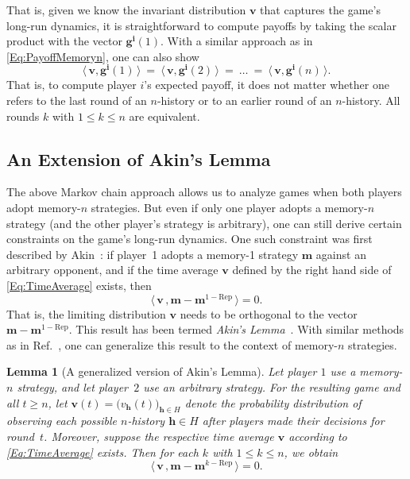 \documentclass[9pt,twoside,lineno]{pnas-new}
\theoremstyle{plainCl1}
\newtheorem{lemma}{Lemma}
\theoremstyle{plainCl2}
\begin{document}
That is, given we know the invariant distribution $\mathbf{v}$ that captures the game's long-run dynamics, it is straightforward to compute payoffs by taking the scalar product with the vector $\mathbf{g^i}(1)$.
With a similar approach as in \eqref{Eq:PayoffMemoryn}, one can also show
\begin{equation} \label{Eq:EquivalencePayoff}
\big\langle\, \mathbf{v}, \mathbf{g^i}(1)\,\big\rangle  
~=~ \big\langle\, \mathbf{v}, \mathbf{g^i}(2)\,\big\rangle
~=~ \ldots
~=~ \big\langle\, \mathbf{v}, \mathbf{g^i}(n)\,\big\rangle.
\end{equation}
That is, to compute player $i$'s expected payoff, it does not matter whether one refers to the last round of an $n$-history or to an earlier round of an $n$-history. All rounds $k$ with $1\!\le\! k\! \le \! n$ are equivalent.



\subsection{An Extension of Akin's Lemma}
The above Markov chain approach allows us to analyze games when both players adopt memory-$n$ strategies. 
But even if only one player adopts a memory-$n$ strategy (and the other player's strategy is arbitrary), one can still  derive certain constraints on the game's long-run dynamics. 
One such constraint was first described by Akin~\citep{akin:EGADS:2016}: 
if player~1 adopts a memory-1 strategy $\mathbf{m}$ against an arbitrary opponent, and if the time average $\mathbf{v}$ defined by the right hand side of \eqref{Eq:TimeAverage} exists, then
\begin{equation}
\big\langle\, \mathbf{v}\, , \mathbf{m}-\mathbf{m}^{1-\text{Rep}}\,\big\rangle = 0. 
\end{equation}
That is, the limiting distribution $\mathbf{v}$ needs to be orthogonal to the vector $\mathbf{m}-\mathbf{m}^{1-\text{Rep}}$. 
This result has been termed {\it Akin's Lemma}~\citep{hilbe:PNAS:2014b}. 
With similar methods as in Ref.~\citep{akin:EGADS:2016}, one can generalize this result to the context of memory-$n$ strategies. 


\begin{lemma}[A generalized version of Akin's Lemma]\label{lemma:AkinGeneralised}
Let player $1$ use a memory-$n$ strategy, and let player~$2$ use an arbitrary
strategy. For the resulting game and all $t\!\ge\!n$, let $\mathbf{v}(t)\!=\!\big( v_\mathbf{h}(t) \big)_{\mathbf{h}\in H}$ denote the probability distribution of observing each possible $n$-history $\mathbf{h}\!\in\! H$ after players made their decisions for round~$t$. Moreover, suppose the respective time average $\mathbf{v}$ according to \eqref{Eq:TimeAverage} exists. Then for each $k$ with $1\!\le\!k\!\le\!n$, we obtain
\begin{equation} \label{Eq:Akin}
\big\langle\, \mathbf{v}\, , \mathbf{m}-\mathbf{m}^{k-\text{Rep}}\,\big\rangle = 0. 
\end{equation}
\end{lemma}
\end{document}
